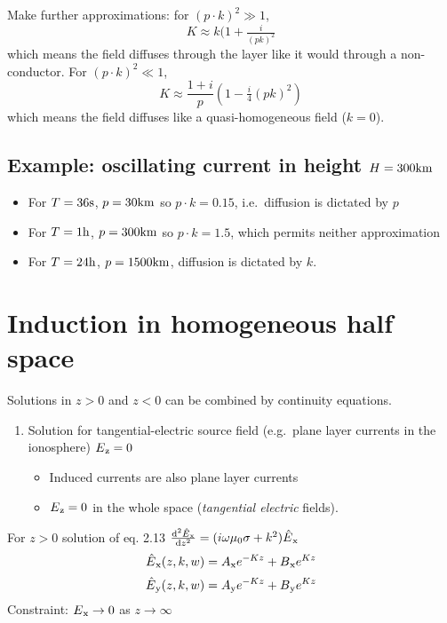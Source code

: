 Make further approximations: for $(p\cdot k)^2 \gg 1$, \[
  K \approx k(1+\tfrac{i}{(pk)^2}
\] which means the field diffuses through the layer like it would
through a non-conductor. For $(p\cdot k)^2 \ll 1$, \[
  K \approx \frac{1+i}{p}(1 - \tfrac{i}4(pk)^2)
\] which means the field diffuses like a quasi-homogeneous field
($k=0$).

\subsection{Example: oscillating current in height
$H=300\mathrm{km}$}\label{example-oscillating-current-in-height-h300physukm}

\begin{itemize}
\itemsep1pt\parskip0pt
\item
  For $T = 36\mathrm{s}$, $p = 30\mathrm{km}$ so $p\cdot k = 0.15$,
  i.e.~diffusion is dictated by $p$
\item
  For $T = 1\mathrm{h}$, $p = 300\mathrm{km}$ so $p\cdot k = 1.5$, which
  permits neither approximation
\item
  For $T = 24\mathrm{h}$, $p = 1500\mathrm{km}$, diffusion is dictated by
  $k$.
\end{itemize}

\section{Induction in homogeneous half
space}\label{induction-in-homogeneous-half-space}

Solutions in $z>0$ and $z<0$ can be combined by continuity equations.

\begin{enumerate}
\def\labelenumi{\arabic{enumi}.}
\itemsep1pt\parskip0pt
\item
  Solution for tangential-electric source field (e.g.~plane layer
  currents in the ionosphere) $E\text{$_{\mathrm{z}}$}=0$

  \begin{itemize}
  \itemsep1pt\parskip0pt
  \item
    Induced currents are also plane layer currents
  \item
    $E\text{$_{\mathrm{z}}$} = 0$ in the whole space (\emph{tangential electric}
    fields).
  \end{itemize}
\end{enumerate}

For $z>0$ solution of eq. 2.13
$\frac{\mathrm{d}^2\hat{E}\text{$_{\mathrm{x}}$}}{\mathrm{d} z^2} = (i\omega\mu_0\sigma + k^2)\hat{E}\text{$_{\mathrm{x}}$}$
\[
  \hat{E}\text{$_{\mathrm{x}}$}(z,k,w) = A\text{$_{\mathrm{x}}$} e^{-Kz} + B\text{$_{\mathrm{x}}$}e^{Kz}
\] \[
  \hat{E}\text{$_{\mathrm{y}}$}(z,k,w) = A\text{$_{\mathrm{y}}$} e^{-Kz} + B\text{$_{\mathrm{y}}$}e^{Kz}
\] Constraint: $E\text{$_{\mathrm{x}}$}\to 0$ as $z \to\infty$

